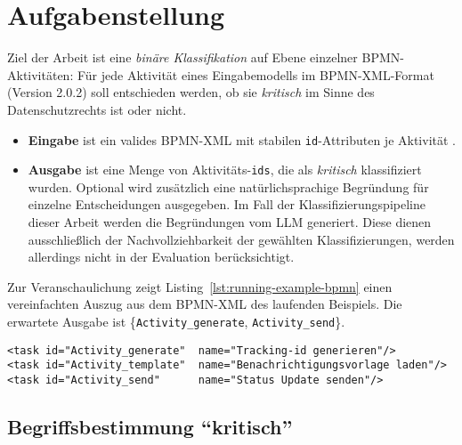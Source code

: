 \section{Aufgabenstellung}\label{sec:aufgabenstellung}

Ziel der Arbeit ist eine \emph{binäre Klassifikation} auf Ebene einzelner \ac{BPMN}-Aktivitäten: Für jede Aktivität eines Eingabemodells im \ac{BPMN}-XML-Format (Version 2.0.2) \cite{omgbpmn} soll entschieden werden, ob sie \emph{kritisch} im Sinne des Datenschutzrechts ist oder nicht.

\begin{itemize}
    \item \textbf{Eingabe} ist ein valides \ac{BPMN}-XML mit stabilen \texttt{id}-Attributen je Aktivität \cite{omgbpmn}.
    \item \textbf{Ausgabe} ist eine Menge von Aktivitäts-\texttt{ids}, die als \emph{kritisch} klassifiziert wurden. Optional wird zusätzlich eine natürlichsprachige Begründung für einzelne Entscheidungen ausgegeben. Im Fall der Klassifizierungspipeline dieser Arbeit werden die Begründungen vom \ac{LLM} generiert. Diese dienen ausschließlich der Nachvollziehbarkeit der gewählten Klassifizierungen, werden allerdings nicht in der Evaluation berücksichtigt.
\end{itemize}

Zur Veranschaulichung zeigt Listing~\ref{lst:running-example-bpmn} einen vereinfachten  Auszug aus dem \ac{BPMN}-XML des laufenden Beispiels. Die erwartete Ausgabe ist \{\texttt{Activity\_generate}, \texttt{Activity\_send}\}.

\begin{lstlisting}[caption={BPMN-XML-Auszug des laufenden Beispiels}, label={lst:running-example-bpmn}]
<task id="Activity_generate"  name="Tracking-id generieren"/>
<task id="Activity_template"  name="Benachrichtigungsvorlage laden"/>
<task id="Activity_send"      name="Status Update senden"/>
\end{lstlisting}

\subsection*{Begriffsbestimmung \enquote{kritisch}}


